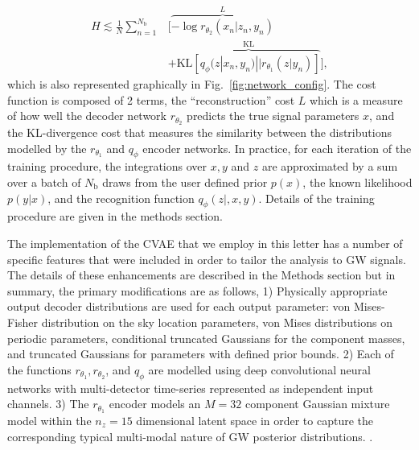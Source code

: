 %
\begin{align}\label{eq:cost3} H \lesssim
\frac{1}{N}\sum_{n=1}^{N_{\text{b}}}&\Big[\overbrace{-\log
r_{\theta_{2}}(x_{n}|z_{n},y_{n})}^{L}\nonumber\\
&+\overbrace{\text{KL}\left[q_{\phi}(z|x_{n},y_{n})||r_{\theta_{1}}(z|y_{n})\right]}^{\text{KL}}\Big],
\end{align}
%
which is also represented graphically in Fig.~\ref{fig:network_config}.
The cost function is composed of 2 terms, the ``reconstruction'' cost $L$ which
is a measure of how well the decoder network $r_{\theta_2}$ predicts the true
signal parameters $x$, and the \ac{KL}-divergence cost that measures the
similarity between the distributions modelled by the $r_{\theta_1}$ and
$q_{\phi}$ encoder networks. In practice, for each iteration of the training
procedure, the integrations over $x,y$ and $z$ are approximated by a sum over a
batch of $N_{\text{b}}$ draws from the user defined prior $p(x)$, the known
likelihood $p(y|x)$, and the recognition function $q_{\phi}(z|,x,y)$. Details
of the training procedure are given in the methods section.  

%
%
The implementation of the \ac{CVAE} that we employ in this letter has a
number of specific features that were included in order to tailor the analysis to
\ac{GW} signals. The details of these enhancements are described in the Methods
section but in summary, the primary modifications are as follows, 1) Physically 
appropriate output decoder distributions are used for each output parameter: 
von Mises-Fisher distribution on the sky location parameters, von Mises 
distributions on periodic parameters, conditional truncated Gaussians for 
the component masses, and truncated Gaussians for
parameters with defined prior bounds. 2) Each of the
functions $r_{\theta_1},r_{\theta_2}$, and $q_{\phi}$ are modelled using deep
convolutional neural networks with multi-detector time-series represented as
independent input channels. 3) The $r_{\theta_1}$ encoder models an $M=32$ component
Gaussian mixture model within the $n_{z}=15$ dimensional latent space in order
to capture the corresponding typical multi-modal nature of \ac{GW} posterior
distributions.  .

